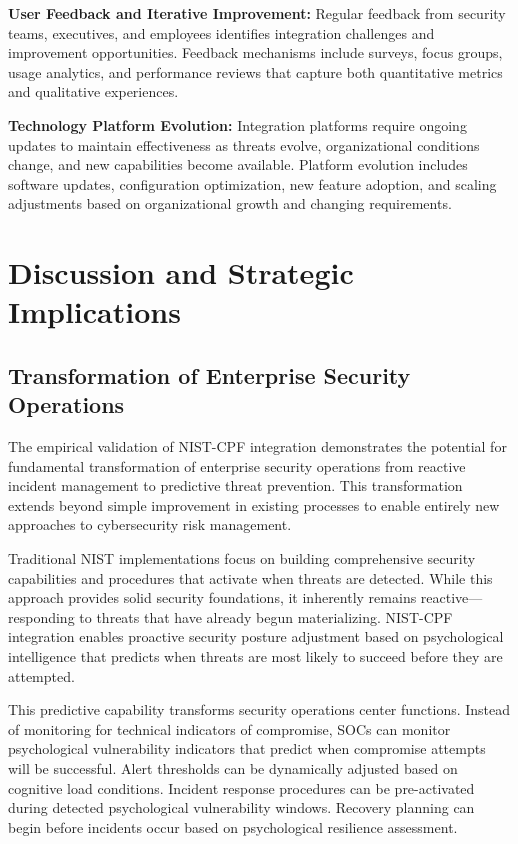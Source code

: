 \documentclass[10pt, twocolumn]{article}
\begin{document}
\textbf{User Feedback and Iterative Improvement:} Regular feedback from security teams, executives, and employees identifies integration challenges and improvement opportunities. Feedback mechanisms include surveys, focus groups, usage analytics, and performance reviews that capture both quantitative metrics and qualitative experiences.

\textbf{Technology Platform Evolution:} Integration platforms require ongoing updates to maintain effectiveness as threats evolve, organizational conditions change, and new capabilities become available. Platform evolution includes software updates, configuration optimization, new feature adoption, and scaling adjustments based on organizational growth and changing requirements.

\section{Discussion and Strategic Implications}

\subsection{Transformation of Enterprise Security Operations}

The empirical validation of NIST-CPF integration demonstrates the potential for fundamental transformation of enterprise security operations from reactive incident management to predictive threat prevention. This transformation extends beyond simple improvement in existing processes to enable entirely new approaches to cybersecurity risk management.

Traditional NIST implementations focus on building comprehensive security capabilities and procedures that activate when threats are detected. While this approach provides solid security foundations, it inherently remains reactive—responding to threats that have already begun materializing. NIST-CPF integration enables proactive security posture adjustment based on psychological intelligence that predicts when threats are most likely to succeed before they are attempted.

This predictive capability transforms security operations center functions. Instead of monitoring for technical indicators of compromise, SOCs can monitor psychological vulnerability indicators that predict when compromise attempts will be successful. Alert thresholds can be dynamically adjusted based on cognitive load conditions. Incident response procedures can be pre-activated during detected psychological vulnerability windows. Recovery planning can begin before incidents occur based on psychological resilience assessment.
\end{document}
